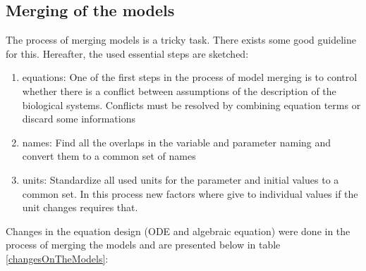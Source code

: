 \subsection{Merging of the models}
The process of merging models is a tricky task. There exists some good guideline \cite{Liebermeister2008ValidityAC} for this.
Hereafter, the used essential steps are sketched:
\begin{enumerate}
	\item equations: One of the first steps in the process of model merging is to control whether there is a conflict between assumptions of the description of the biological systems. Conflicts must be resolved by combining equation terms or discard some informations
	\item names: Find all the overlaps in the variable and parameter naming and convert them to a common set of names
	\item units: Standardize all used units for the parameter and initial values to a common set. In this process new factors where give to individual values if the unit changes requires that.
\end{enumerate}
Changes in the equation design (ODE and algebraic equation) were done in the process of merging the models and are presented below in table \ref{changesOnTheModels}:\newpage

